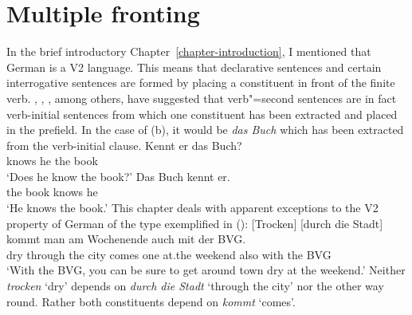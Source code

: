 
\newcommand{\ao}{Avgustinova und Oliva\xspace}%


\chapter{Multiple fronting}
\label{chapter-mult-front}


In the brief introductory Chapter~\ref{chapter-introduction}, I mentioned that German is a V2
language. This means that declarative sentences and certain interrogative sentences are formed by
placing a constituent in front of the finite verb.
\citet{Thiersch78a}, \citet[]{denBesten83a}, \citet{Uszkoreit87a}, among others, have suggested that
verb"=second sentences are in fact verb-initial sentences from which one constituent has been extracted and placed in the prefield. 
In the case of (b), it would be \emph{das Buch} which has been extracted from the verb-initial clause.
\eal
\ex 
\gll Kennt er das Buch?\\
	 knows he the book\\
\glt `Does he know the book?'
\ex 
\gll Das Buch kennt er.\\
	 the book knows he\\
\glt `He knows the book.'
\zl
This chapter deals with apparent exceptions to the V2 property of German of the type exemplified in ():
\ea
\gll {}[Trocken] [durch die Stadt] kommt man am Wochenende auch mit der BVG.\footnotemark\\
	 \spacebr{}dry \spacebr{}through the city comes one at.the weekend also with the BVG\\
\glt `With the BVG, you can be sure to get around town dry at the weekend.'
\z
Neither \emph{trocken} `dry' depends on \emph{durch die Stadt} `through the city' nor the other way
round. Rather both constituents depend on \emph{kommt} `comes'.

